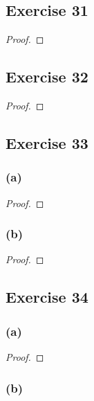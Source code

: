 \documentclass[14pt]{extarticle}
\begin{document}
\subsection{Exercise 31}

\begin{proof}

\end{proof}

\subsection{Exercise 32}

\begin{proof}

\end{proof}

\subsection{Exercise 33}

\subsubsection{(a)}

\begin{proof}

\end{proof}

\subsubsection{(b)}

\begin{proof}

\end{proof}

\subsection{Exercise 34}

\subsubsection{(a)}

\begin{proof}

\end{proof}

\subsubsection{(b)}
\end{document}
